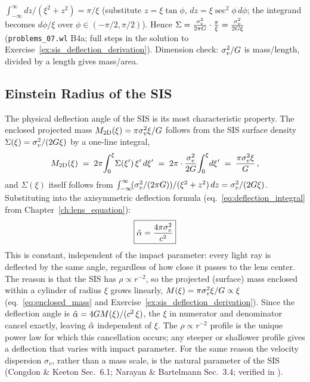 \begin{derivation}
$\int_{-\infty}^{\infty}dz/(\xi^2+z^2) = \pi/\xi$ (substitute $z = \xi\tan\phi$,
$dz = \xi\sec^2\phi\,d\phi$; the integrand becomes $d\phi/\xi$ over
$\phi\in(-\pi/2,\pi/2)$).  Hence
$\Sigma = \frac{\sigma_v^2}{2\pi G}\cdot\frac{\pi}{\xi} = \frac{\sigma_v^2}{2G\xi}$
(\texttt{problems\_07.wl} B4a; full steps in the solution to
Exercise~\ref{ex:sis_deflection_derivation}).  Dimension check:
$\sigma_v^2/G$ is mass/length, divided by a length gives mass/area.
\end{derivation}

\subsection{Einstein Radius of the SIS}

The physical deflection angle of the SIS is its most characteristic
property.  The enclosed projected mass
$M_{\mathrm{2D}}(\xi) = \pi\sigma_v^2\xi/G$ follows from the
SIS surface density $\Sigma(\xi) = \sigma_v^2/(2G\xi)$ by a
one-line integral,
\begin{equation*}
    M_{\mathrm{2D}}(\xi)
    \;=\; 2\pi\!\int_0^\xi\!\Sigma(\xi')\,\xi'\,d\xi'
    \;=\; 2\pi\cdot\frac{\sigma_v^2}{2G}\!\int_0^\xi\!d\xi'
    \;=\; \frac{\pi\sigma_v^2\xi}{G}\,,
\end{equation*}
and $\Sigma(\xi)$ itself follows from
$\int_{-\infty}^{\infty}\!(\sigma_v^2/(2\pi G))/(\xi^2+z^2)\,dz
= \sigma_v^2/(2G\xi)$.  Substituting into the axisymmetric
deflection formula (eq.~\ref{eq:deflection_integral} from Chapter~\ref{ch:lens_equation}):
\begin{equation}
    \boxed{
    \hat{\alpha} = \frac{4\pi\sigma_v^2}{c^2}
    }
    \label{eq:sis_alphahat}
\end{equation}
This is constant, independent of the impact parameter: every light ray
is deflected by the same angle, regardless of how close it passes to
the lens center.  The reason is that the SIS has $\rho \propto r^{-2}$,
so the projected (surface) mass enclosed within a cylinder of radius
$\xi$ grows linearly, $M(\xi) = \pi\sigma_v^2\xi/G \propto \xi$
(eq.~\ref{eq:enclosed_mass} and Exercise~\ref{ex:sis_deflection_derivation}).
Since the deflection angle is $\hat{\alpha} = 4G M(\xi)/(c^2\,\xi)$,
the $\xi$ in numerator and denominator cancel exactly, leaving
$\hat{\alpha}$ independent of $\xi$.  The $\rho \propto r^{-2}$ profile is
the unique power law for which this cancellation occurs; any
steeper or shallower profile gives a deflection that varies with impact
parameter.  For the same reason the velocity dispersion $\sigma_v$, rather
than a mass scale, is the natural parameter of the SIS
(Congdon \& Keeton Sec.~6.1; Narayan \& Bartelmann Sec.~3.4;
verified in
).

